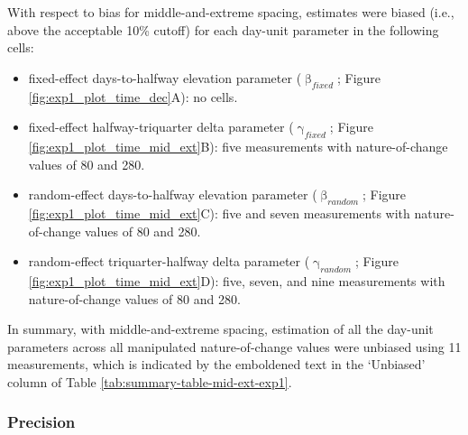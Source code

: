 \documentclass[
12pt, %
twoside,
english]{guelphthesis}
\begin{document}
With respect to bias for middle-and-extreme spacing, estimates were biased (i.e., above the acceptable 10\% cutoff) for each day-unit parameter in the following cells:
\begin{itemize}
\tightlist
\item
  fixed-effect days-to-halfway elevation parameter (\(\upbeta_{fixed}\); Figure \ref{fig:exp1_plot_time_dec}A): no cells.
\item
  fixed-effect halfway-triquarter delta parameter (\(\upgamma_{fixed}\); Figure \ref{fig:exp1_plot_time_mid_ext}B): five measurements with nature-of-change values of 80 and 280.
\item
  random-effect days-to-halfway elevation parameter (\(\upbeta_{random}\); Figure \ref{fig:exp1_plot_time_mid_ext}C): five and seven measurements with nature-of-change values of 80 and 280.
\item
  random-effect triquarter-halfway delta parameter (\(\upgamma_{random}\); Figure \ref{fig:exp1_plot_time_mid_ext}D): five, seven, and nine measurements with nature-of-change values of 80 and 280.
\end{itemize}
In summary, with middle-and-extreme spacing, estimation of all the day-unit parameters across all manipulated nature-of-change values were unbiased using 11 measurements, which is indicated by the emboldened text in the `Unbiased' column of Table \ref{tab:summary-table-mid-ext-exp1}.

\hypertarget{precision-mid-ext-exp1}{%
\subsubsection{Precision}\label{precision-mid-ext-exp1}}
\end{document}
